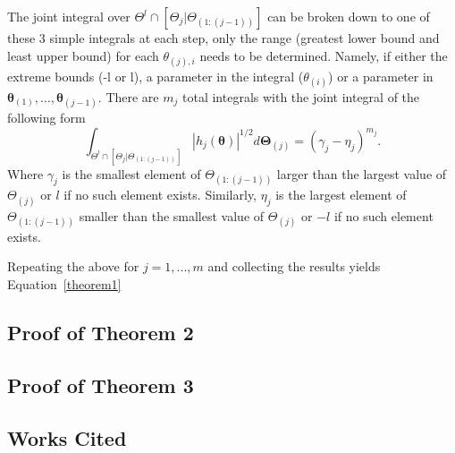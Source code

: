 \documentclass[Proceedings]{ascelike}
\begin{document}
The joint integral over
$\Theta^{l}\cap[\Theta_{j}|\Theta_{(1:(j-1))}]$ can be broken
down to one of these 3 simple integrals at each step, only the range
(greatest lower bound and least upper bound) for each $\theta_{(j),i}$
needs to be determined.  Namely, if either the extreme bounds (-l or
l), a parameter in the integral ($\theta_{(i)}$) or a parameter in
$\boldsymbol{\theta}_{(1)}, \ldots, \boldsymbol{\theta}_{(j-1)}$. There are $m_j$ total integrals with the joint integral of the following form
\[
\int_{\Theta^{l}\cap[\Theta_{j}|\Theta_{(1:(j-1))}]}
|h_j(\boldsymbol{\theta})|^{1/2}   
d\boldsymbol{\Theta}_{(j)}  =  (\gamma_j - \eta_j)^{m_j}.
\]
Where $\gamma_j$ is the smallest element of $\Theta_{(1:(j-1))}$ larger than the largest value of $\Theta_{(j)}$ or $l$ if no such element exists. Similarly, $\eta_j$ is the largest element of $\Theta_{(1:(j-1))}$ smaller than the smallest value of $\Theta_{(j)}$ or $-l$ if no such element exists.

Repeating the above for $j=1,..., m$ and collecting the results yields Equation~\ref{theorem1}

\subsection*{Proof of Theorem 2}

\subsection*{Proof of Theorem 3}


\subsection*{Works Cited}\label{section:references}
%
%

%
%
%
\end{document}
